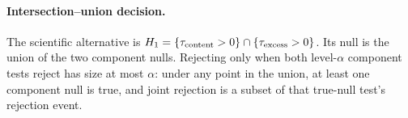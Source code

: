 \paragraph{Intersection--union decision.}
The scientific alternative is $H_1=\{\tau_{\rm content}>0\}\cap
\{\tau_{\rm excess}>0\}$. Its null is the union of the two component nulls.
Rejecting only when both level-$\alpha$ component tests reject has size at most
$\alpha$: under any point in the union, at least one component null is true,
and joint rejection is a subset of that true-null test's rejection event.
